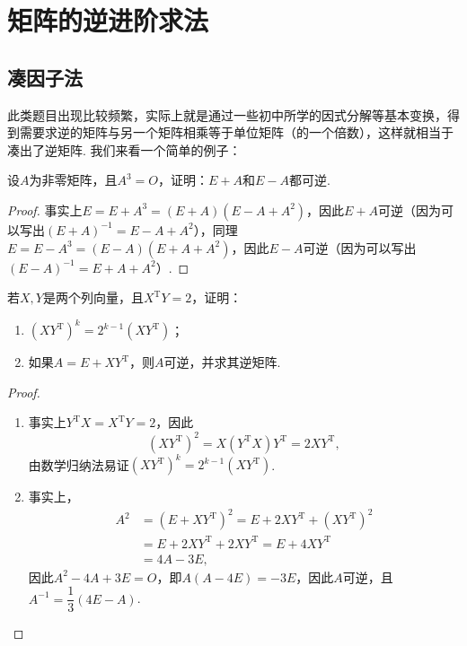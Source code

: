 \section{矩阵的逆进阶求法}

\subsection{凑因子法}

此类题目出现比较频繁，实际上就是通过一些初中所学的因式分解等基本变换，得到需要求逆的矩阵与另一个矩阵相乘等于单位矩阵（的一个倍数），这样就相当于凑出了逆矩阵. 我们来看一个简单的例子：
\begin{example}{}{}
    设$A$为非零矩阵，且$A^3=O$，证明：$E+A$和$E-A$都可逆.
\end{example}

\begin{proof}
    事实上$E=E+A^3=(E+A)(E-A+A^2)$，因此$E+A$可逆（因为可以写出$(E+A)^{-1}=E-A+A^2$），同理$E=E-A^3=(E-A)(E+A+A^2)$，因此$E-A$可逆（因为可以写出$(E-A)^{-1} = E + A + A^2$）.
\end{proof}

\begin{example}{}{}
    若$X,Y$是两个列向量，且$X^\mathrm{T}Y=2$，证明：
    \begin{enumerate}
        \item $(XY^\mathrm{T})^k=2^{k-1}(XY^{\mathrm{T}})$；

        \item 如果$A=E+XY^\mathrm{T}$，则$A$可逆，并求其逆矩阵.
    \end{enumerate}
\end{example}

\begin{proof}
    \begin{enumerate}
        \item 事实上$Y^\mathrm{T}X=X^\mathrm{T}Y=2$，因此
              \[(XY^\mathrm{T})^2=X(Y^\mathrm{T}X)Y^\mathrm{T}=2XY^\mathrm{T},\]
              由数学归纳法易证$(XY^\mathrm{T})^k=2^{k-1}(XY^\mathrm{T})$.

        \item 事实上，
              \begin{align*}
                  A^2 & =(E+XY^\mathrm{T})^2=E+2XY^\mathrm{T}+(XY^\mathrm{T})^2 \\
                      & =E+2XY^\mathrm{T}+2XY^\mathrm{T}=E+4XY^\mathrm{T}       \\
                      & =4A-3E,
              \end{align*}
              因此$A^2-4A+3E=O$，即$A(A-4E)=-3E$，因此$A$可逆，且$A^{-1}=\dfrac{1}{3}(4E-A)$.
    \end{enumerate}
\end{proof}

